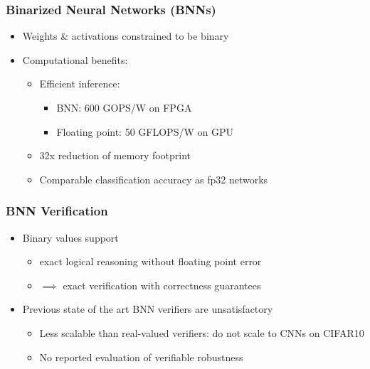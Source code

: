 \documentclass[aspectratio=169%
,serif,mathserif]{beamer}
\begin{document}
\begin{frame}
	\frametitle{Binarized Neural Networks (BNNs)}
	\begin{itemize}
		\item Weights \& activations constrained to be binary
		\item Computational benefits:
		\begin{itemize}
			\item Efficient inference:
			\begin{itemize}
				\item BNN: 600 GOPS/W on FPGA
				\item Floating point: 50 GFLOPS/W on GPU
			\end{itemize}
			\item 32x reduction of memory footprint
			\item Comparable classification accuracy as fp32 networks
		\end{itemize}
		
	\end{itemize}
	
\end{frame}

\begin{frame}
	\frametitle{BNN Verification}
	\begin{itemize}
		\item Binary values support
		\begin{itemize}
			\item exact logical reasoning without floating point error
			\item  $\implies$ exact verification with correctness guarantees
		\end{itemize}
		\item Previous state of the art BNN verifiers are unsatisfactory
		\begin{itemize}
			\item Less scalable than real-valued verifiers: do not scale to CNNs on CIFAR10
			\item No reported evaluation of verifiable robustness
		\end{itemize}
		
	\end{itemize}	

\end{frame}
\end{document}
